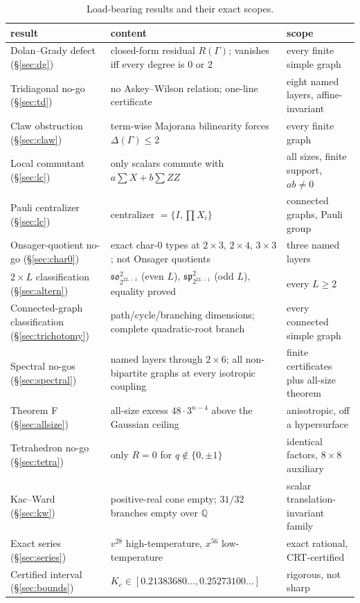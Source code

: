 \documentclass[11pt]{article}
\theoremstyle{definition}
\newcommand{\Qb}{\mathbb{Q}}
\begin{document}
\begin{table}[h]
\centering
\small
\begin{tabular}{@{}p{}p{}p{}@{}}
\toprule
result & content & scope \\ \midrule
Dolan--Grady defect (\S\ref{sec:dg}) & closed-form residual $R(\Gamma)$; vanishes iff every degree is
$0$ or $2$ & every finite simple graph \\
Tridiagonal no-go (\S\ref{sec:td}) & no Askey--Wilson relation; one-line certificate & eight named
layers, affine-invariant \\
Claw obstruction (\S\ref{sec:claw}) & term-wise Majorana bilinearity forces $\Delta(\Gamma)\le2$ &
every finite graph \\
Local commutant (\S\ref{sec:lc}) & only scalars commute with $a\sum X+b\sum ZZ$ & all sizes, finite
support, $ab\ne0$ \\
Pauli centralizer (\S\ref{sec:lc}) & centralizer $=\{I,\prod X_i\}$ & connected graphs, Pauli group \\
Onsager-quotient no-go (\S\ref{sec:char0}) & exact char-$0$ types at $2\times3$, $2\times4$,
$3\times3$; not Onsager quotients & three named layers \\
$2\times L$ classification (\S\ref{sec:altern}) & $\mathfrak{so}_{2^{2L-1}}^2$ (even $L$),
$\mathfrak{sp}_{2^{2L-1}}^2$ (odd $L$), equality proved & every $L\ge2$ \\
Connected-graph classification (\S\ref{sec:trichotomy}) & path/cycle/branching dimensions; complete
quadratic-root branch & every connected simple graph \\
Spectral no-gos (\S\ref{sec:spectral}) & named layers through $2\times6$; all non-bipartite graphs
at every isotropic coupling & finite certificates plus all-size theorem \\
Theorem F (\S\ref{sec:allsize}) & all-size excess $48\cdot3^{n-4}$ above the Gaussian ceiling &
anisotropic, off a hypersurface \\
Tetrahedron no-go (\S\ref{sec:tetra}) & only $R=0$ for $q\notin\{0,\pm1\}$ & identical factors,
$8\times8$ auxiliary \\
Kac--Ward (\S\ref{sec:kw}) & positive-real cone empty; $31/32$ branches empty over $\Qb$ & scalar
translation-invariant family \\
Exact series (\S\ref{sec:series}) & $v^{28}$ high-temperature, $x^{56}$ low-temperature & exact
rational, CRT-certified \\
Certified interval (\S\ref{sec:bounds}) & $K_c\in[0.21383680\ldots,0.25273100\ldots]$ & rigorous,
not sharp \\
\bottomrule
\end{tabular}
\caption{Load-bearing results and their exact scopes.}
\label{tab:summary}
\end{table}
\end{document}
